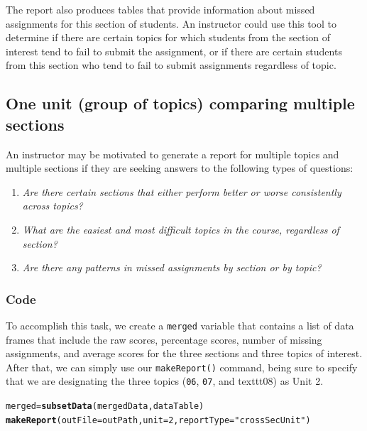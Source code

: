 \documentclass{article}\usepackage[]{graphicx}\usepackage[]{color}
\makeatletter
\newcommand{\hlnum}[1]{\textcolor[rgb]{0.686,0.059,0.569}{#1}}%
\newcommand{\hlstr}[1]{\textcolor[rgb]{0.192,0.494,0.8}{#1}}%
\newcommand{\hlstd}[1]{\textcolor[rgb]{0.345,0.345,0.345}{#1}}%
\newcommand{\hlkwb}[1]{\textcolor[rgb]{0.69,0.353,0.396}{#1}}%
\newcommand{\hlkwc}[1]{\textcolor[rgb]{0.333,0.667,0.333}{#1}}%
\newcommand{\hlkwd}[1]{\textcolor[rgb]{0.737,0.353,0.396}{\textbf{#1}}}%
\newenvironment{kframe}{%
 \def\at@end@of@kframe{}%
 \ifinner\ifhmode%
  \def\at@end@of@kframe{\end{minipage}}%
  \begin{minipage}{\columnwidth}%
 \fi\fi%
 \def\FrameCommand##1{\hskip\@totalleftmargin \hskip-\fboxsep
 \colorbox{shadecolor}{##1}\hskip-\fboxsep
     \hskip-\linewidth \hskip-\@totalleftmargin \hskip\columnwidth}%
 \MakeFramed {\advance\hsize-\width
   \@totalleftmargin\z@ \linewidth\hsize
   \@setminipage}}%
 {\par\unskip\endMakeFramed%
 \at@end@of@kframe}
\newenvironment{knitrout}{}{} %
\numberwithin{equation}{section} %
\makeatother
\begin{document}
The report also produces tables that provide information about missed assignments for this section of students. An instructor could use this tool to determine if there are certain topics for which students from the section of interest tend to fail to submit the assignment, or if there are certain students from this section who tend to fail to submit assignments regardless of topic.

\subsection{One unit (group of topics) comparing multiple sections}

An instructor may be motivated to generate a report for multiple topics and multiple sections if they are seeking answers to the following types of questions:

\begin{enumerate}
\item \textit{Are there certain sections that either perform better or worse consistently across topics?}
\item \textit{What are the easiest and most difficult topics in the course, regardless of section?}
\item \textit{Are there any patterns in missed assignments by section or by topic?}
\end{enumerate}

\subsubsection{Code}
\label{sec:crossSecU}

To accomplish this task, we create a \texttt{merged} variable that contains a list of data frames that include the raw scores, percentage scores, number of missing assignments, and average scores for the three sections and three topics of interest. After that, we can simply use our \texttt{makeReport()} command, being sure to specify that we are designating the three topics (\texttt{06}, \texttt{07}, and texttt{08}) as Unit 2.

\begin{knitrout}
\color{fgcolor}\begin{kframe}
\begin{alltt}
\hlstd{merged} \hlkwb{=} \hlkwd{subsetData}\hlstd{(mergedData, dataTable)}
\hlkwd{makeReport}\hlstd{(}\hlkwc{outFile} \hlstd{= outPath,} \hlkwc{unit} \hlstd{=} \hlnum{2}\hlstd{,} \hlkwc{reportType} \hlstd{=} \hlstr{"crossSecUnit"}\hlstd{)}
\end{alltt}
\end{kframe}
\end{knitrout}
\end{document}
